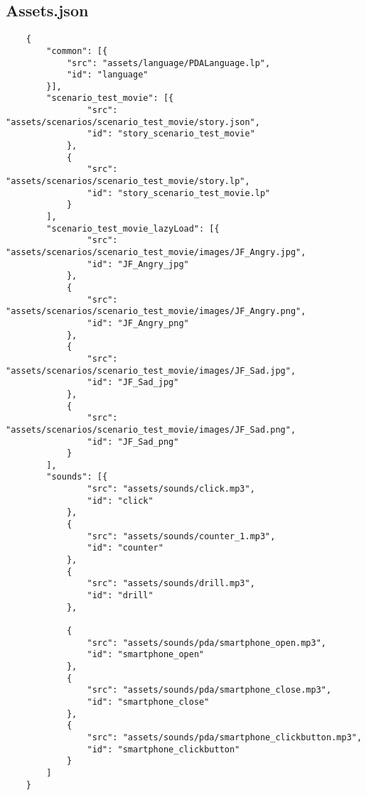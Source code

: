 \renewcommand\appendixpagename{Bijlagen}
\renewcommand\appendixtocname{Bijlagen}

\begin{appendices}
    \chapter{Assets.json}    
    \label{app:assetsjson}
    \lstset{language=JSON}
    \begin{lstlisting}
    {
        "common": [{
            "src": "assets/language/PDALanguage.lp",
            "id": "language"
        }],
        "scenario_test_movie": [{
                "src": "assets/scenarios/scenario_test_movie/story.json",
                "id": "story_scenario_test_movie"
            },
            {
                "src": "assets/scenarios/scenario_test_movie/story.lp",
                "id": "story_scenario_test_movie.lp"
            }
        ],
        "scenario_test_movie_lazyLoad": [{
                "src": "assets/scenarios/scenario_test_movie/images/JF_Angry.jpg",
                "id": "JF_Angry_jpg"
            },
            {
                "src": "assets/scenarios/scenario_test_movie/images/JF_Angry.png",
                "id": "JF_Angry_png"
            },
            {
                "src": "assets/scenarios/scenario_test_movie/images/JF_Sad.jpg",
                "id": "JF_Sad_jpg"
            },
            {
                "src": "assets/scenarios/scenario_test_movie/images/JF_Sad.png",
                "id": "JF_Sad_png"
            }
        ],
        "sounds": [{
                "src": "assets/sounds/click.mp3",
                "id": "click"
            },
            {
                "src": "assets/sounds/counter_1.mp3",
                "id": "counter"
            },
            {
                "src": "assets/sounds/drill.mp3",
                "id": "drill"
            },
    
            {
                "src": "assets/sounds/pda/smartphone_open.mp3",
                "id": "smartphone_open"
            },
            {
                "src": "assets/sounds/pda/smartphone_close.mp3",
                "id": "smartphone_close"
            },
            {
                "src": "assets/sounds/pda/smartphone_clickbutton.mp3",
                "id": "smartphone_clickbutton"
            }
        ]
    }
    \end{lstlisting}


\end{appendices}
